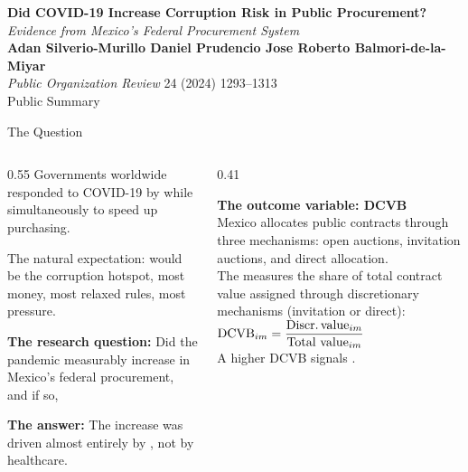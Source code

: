 \documentclass[aspectratio=169, 10pt]{beamer}
\begin{document}
\begin{frame}[plain]
  \vspace{1.5em}
  \begin{center}
    {\color{navyblue}\Large\bfseries
      Did COVID-19 Increase Corruption Risk in Public Procurement?}\\[1em]
    {\color{institutgold}\large\itshape
      Evidence from Mexico's Federal Procurement System}\\[1.5em]
    {\color{navyblue}\normalsize\bfseries
      Adan Silverio-Murillo \quad Daniel Prudencio \quad
      Jose Roberto Balmori-de-la-Miyar}\\[0.3em]
    {\color{medgray}\small \textit{Public Organization Review} 24 (2024) 1293--1313}\\[1.5em]
    {\color{medgray}\small Public Summary}
  \end{center}
\end{frame}

\begin{frame}{The Question}
  \begin{columns}
    \begin{column}{0.55\textwidth}
      Governments worldwide responded to COVID-19 by  while simultaneously  to speed up purchasing.

      \vspace{0.7em}
      The natural expectation:  would be the
      corruption hotspot, most money, most relaxed rules, most pressure.

      \vspace{0.7em}
      \textbf{The research question:} Did the pandemic measurably increase
       in Mexico's federal procurement, and if so,

      \vspace{0.7em}
      \textbf{The answer:} The increase was driven almost entirely by
      , not by healthcare.
    \end{column}
    \begin{column}{0.41\textwidth}
      \begin{keybox}
        \textbf{The outcome variable: DCVB}\\[0.5em]
        Mexico allocates public contracts through three mechanisms:
        open auctions, invitation auctions, and direct allocation.\\[0.5em]
        The  measures the share of total contract value
        assigned through discretionary mechanisms (invitation or direct):
        {\small $\text{DCVB}_{im} =
          \dfrac{\text{Discr.\,value}_{im}}{\text{Total value}_{im}}$}\\[0.3em]
        A higher DCVB signals .
      \end{keybox}
    \end{column}
  \end{columns}
\end{frame}
\end{document}
